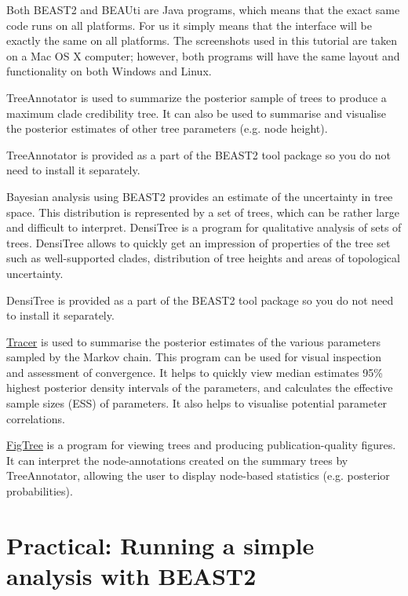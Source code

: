\documentclass[11pt]{article}
\begin{document}
Both BEAST2 and BEAUti are Java programs, which means that the exact same code runs on all platforms. For us it simply means that the interface will be exactly the same on all platforms. The screenshots used in this tutorial are taken on a Mac OS X computer; however, both programs will have the same layout and functionality on both Windows and Linux.


TreeAnnotator is used to summarize the posterior sample of trees to produce a maximum clade credibility tree. It can also be used to summarise and visualise the posterior estimates of other tree parameters (e.g. node height).

TreeAnnotator is provided as a part of the BEAST2 tool package so you do not need to install it separately.


Bayesian analysis using BEAST2 provides an estimate of the uncertainty in tree space. This distribution is represented by a set of trees, which can be rather large and difficult to interpret. DensiTree is a program for qualitative analysis of sets of trees. DensiTree allows to quickly get an impression of properties of the tree set such as well-supported clades, distribution of tree heights and areas of topological uncertainty.

DensiTree is provided as a part of the BEAST2 tool package so you do not need to install it separately.


\href{http://tree.bio.ed.ac.uk/software/tracer}{Tracer} is used to summarise the posterior estimates of the various parameters sampled by the Markov chain. This program can be used for visual inspection and assessment of convergence. It helps to quickly view median estimates 95\% highest posterior density intervals of the parameters, and calculates the effective sample sizes (ESS) of parameters. It also helps to visualise potential parameter correlations.


\href{http://tree.bio.ed.ac.uk/software/figtree}{FigTree} is a program for viewing trees and producing publication-quality figures. It can interpret the node-annotations created on the summary trees by TreeAnnotator, allowing the user to display node-based statistics (e.g. posterior probabilities).

\newpage
\section{Practical: Running a simple analysis with BEAST2}
\end{document}
